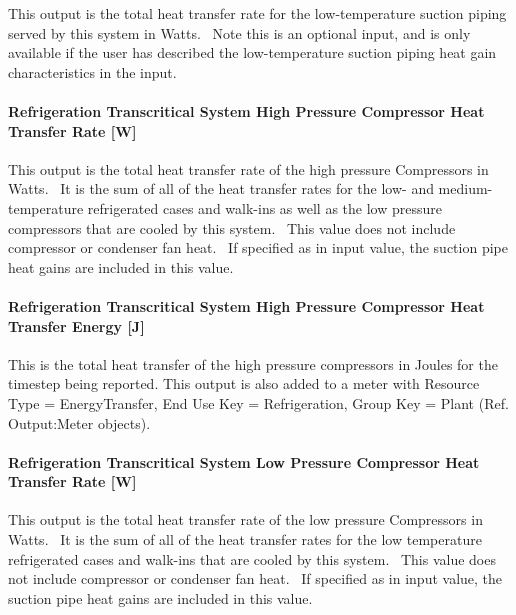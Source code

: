 This output is the total heat transfer rate for the low-temperature suction piping served by this system in Watts.~ Note this is an optional input, and is only available if the user has described the low-temperature suction piping heat gain characteristics in the input.

\paragraph{Refrigeration Transcritical System High Pressure Compressor Heat Transfer Rate {[}W{]}}\label{refrigeration-transcritical-system-high-pressure-compressor-heat-transfer-rate-w}

This output is the total heat transfer rate of the high pressure Compressors in Watts.~ It is the sum of all of the heat transfer rates for the low- and medium-temperature refrigerated cases and walk-ins as well as the low pressure compressors that are cooled by this system.~ This value does not include compressor or condenser fan heat.~ If specified as in input value, the suction pipe heat gains are included in this value.

\paragraph{Refrigeration Transcritical System High Pressure Compressor Heat Transfer Energy {[}J{]}}\label{refrigeration-transcritical-system-high-pressure-compressor-heat-transfer-energy-j}

This is the total heat transfer of the high pressure compressors in Joules for the timestep being reported. This output is also added to a meter with Resource Type = EnergyTransfer, End Use Key = Refrigeration, Group Key = Plant (Ref. Output:Meter objects).

\paragraph{Refrigeration Transcritical System Low Pressure Compressor Heat Transfer Rate {[}W{]}}\label{refrigeration-transcritical-system-low-pressure-compressor-heat-transfer-rate-w}

This output is the total heat transfer rate of the low pressure Compressors in Watts.~ It is the sum of all of the heat transfer rates for the low temperature refrigerated cases and walk-ins that are cooled by this system.~ This value does not include compressor or condenser fan heat.~ If specified as in input value, the suction pipe heat gains are included in this value.

